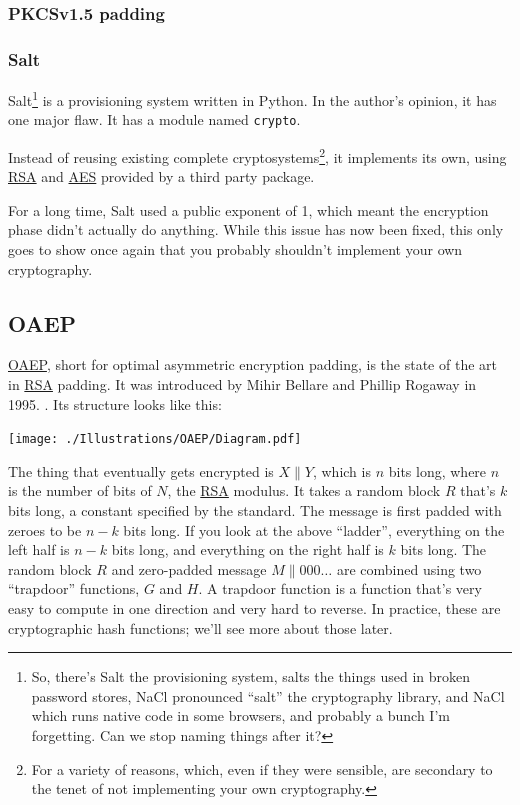 \documentclass[11pt,ebook,table,dvipsnames]{memoir}
\begin{document}
\subsubsection{PKCSv1.5 padding}
\label{sec-2-5-3-3-1}

\subsubsection{Salt}
\label{sec-2-5-3-3-2}

Salt\footnote{So, there's Salt the provisioning system, salts the things
used in broken password stores, NaCl pronounced \enquote{salt} the
cryptography library, and NaCl which runs native code in some
browsers, and probably a bunch I'm forgetting. Can we stop naming
things after it?} is a provisioning system written in Python. In the
author's opinion, it has one major flaw. It has a module named
\texttt{crypto}.

Instead of reusing existing complete cryptosystems\footnote{For a variety
of reasons, which, even if they were sensible, are secondary to the
tenet of not implementing your own cryptography.}, it implements its
own, using \hyperref[RSA]{RSA} and \hyperref[AES]{AES} provided by a third party package.

For a long time, Salt used a public exponent of 1, which meant the
encryption phase didn't actually do anything. While this issue has
now been fixed, this only goes to show once again that you probably
shouldn't implement your own cryptography.


\subsection{\label{OAEP}OAEP}
\label{sec-2-5-3-4}

\hyperref[OAEP]{OAEP}, short for optimal asymmetric encryption padding, is the state of
the art in \hyperref[RSA]{RSA} padding. It was introduced by Mihir Bellare and Phillip
Rogaway in 1995. \cite{bellarerogaway:oaep}. Its structure looks like
this:

\texttt{[image: ./Illustrations/OAEP/Diagram.pdf]}

The thing that eventually gets encrypted is $X \| Y$, which is $n$
bits long, where $n$ is the number of bits of $N$, the \hyperref[RSA]{RSA} modulus. It
takes a random block $R$ that's $k$ bits long, a constant specified by
the standard. The message is first padded with zeroes to be $n - k$
bits long. If you look at the above \enquote{ladder}, everything on the left
half is $n - k$ bits long, and everything on the right half is $k$
bits long. The random block $R$ and zero-padded message $M \|
000\ldots$ are combined using two \enquote{trapdoor} functions, $G$ and $H$. A
trapdoor function is a function that's very easy to compute in one
direction and very hard to reverse. In practice, these are
cryptographic hash functions; we'll see more about those later.
\end{document}
